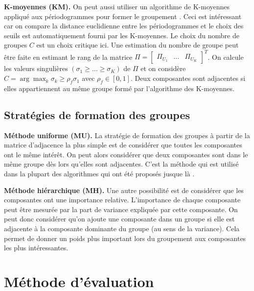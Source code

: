 \documentclass{gretsi}
\newcommand{\val}[3]{(#1_1 #3 \dots #3 #1_#2)}
\newcommand{\inter}{\left[0, 1\right]}
\begin{document}
\textbf{K-moyennes (KM).}\label{par:KM} 
    On peut aussi utiliser un algorithme de K-moyennes appliqué aux périodogrammes pour former le groupement \cite{alvarez_13_auto}.
    Ceci est intéressant car on compare la distance euclidienne entre les périodogrammes et le choix des seuils est automatiquement fourni par les K-moyennes.
    Le choix du nombre de groupes $C$ est un choix critique ici.
    Une estimation du nombre de groupe peut être faite en estimant le rang de la matrice $\Pi = \begin{bmatrix}\Pi_{U_1}&\dots&\Pi_{U_K}\end{bmatrix}^T$.
    On calcule les valeurs singulières $\val{\sigma}{K}{\ge}$ de $\Pi$ et on considère $C = \arg\max_k \sigma_k \ge \rho_f \sigma_1$ avec $\rho_f \in \inter$.
    Deux composantes sont adjacentes si elles appartiennent au même groupe formé par l'algorithme des K-moyennes.


\subsection{Stratégies de formation des groupes}
\label{sub:clust}
\textbf{Méthode uniforme (MU).}
    La stratégie de formation des groupes à partir de la matrice d'adjacence la plus simple est de considérer que toutes les composantes ont le même intérêt.
    On peut alors considérer que deux composantes sont dans le même groupe dès lors qu'elles sont adjacentes.
    C'est la méthode qui est utilisé dans la plupart des algorithmes qui ont été proposés jusque là \cite{abalov_14_auto, alvarez_13_auto}.


\textbf{Méthode hiérarchique (MH).}
    Une autre possibilité est de considérer que les composantes ont une importance relative.
    L'importance de chaque composante peut être mesurée par la part de variance expliquée par cette composante.
    On peut donc considérer qu'on ajoute une composante dans un groupe si elle est adjacente à la composante dominante du groupe (au sens de la variance).
    Cela permet de donner un poids plus important lors du groupement aux composantes les plus intéressantes.


\section{Méthode d'évaluation}
\label{sec:eval}
\end{document}
